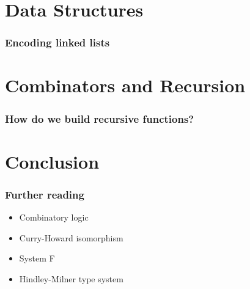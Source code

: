 \documentclass{beamer}
\begin{document}
    \section{Data Structures}
    \begin{frame}
        \frametitle{Encoding linked lists}
    \end{frame}

    \section{Combinators and Recursion}
    \begin{frame}
        \frametitle{How do we build recursive functions?}
    \end{frame}

    \section{Conclusion}
    \begin{frame}
        \frametitle{Further reading}
        \begin{itemize}
            \setlength{\itemsep}{1.5em}
            \item Combinatory logic
            \item Curry-Howard isomorphism
            \item System F
            \item Hindley-Milner type system
        \end{itemize}
    \end{frame}
\end{document}
